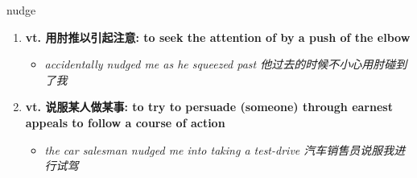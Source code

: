 
\begin{frame}
{\huge nudge}
\begin{center}
\begin{enumerate}\Large
  \item \textbf{vt. 用肘推以引起注意: to seek the attention of by a push of the elbow}
  \begin{itemize}
    \item \em{\Large{accidentally nudged me as he squeezed past 他过去的时候不小心用肘碰到了我}}
  \end{itemize}
  \item \textbf{vt. 说服某人做某事: to try to persuade (someone) through earnest appeals to follow a course of action}
  \begin{itemize}
    \item \em{\Large{the car salesman nudged me into taking a test-drive 汽车销售员说服我进行试驾}}
  \end{itemize}
\end{enumerate}
\end{center}
\end{frame}

